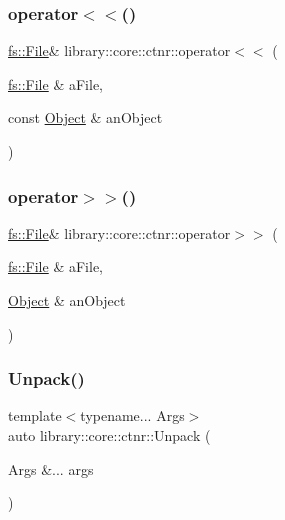 \mbox{\label{namespacelibrary_1_1core_1_1ctnr_af1692b068183ff60da620deb994a8b59}} 
\subsubsection{\texorpdfstring{operator$<$$<$()}{operator<<()}\hspace{0.1cm}{\footnotesize\ttfamily [4/4]}}
{\footnotesize\ttfamily \hyperlink{classlibrary_1_1core_1_1fs_1_1_file}{fs\+::\+File}\& library\+::core\+::ctnr\+::operator$<$$<$ (\begin{DoxyParamCaption}\item[{\hyperlink{classlibrary_1_1core_1_1fs_1_1_file}{fs\+::\+File} \&}]{a\+File,  }\item[{const \hyperlink{classlibrary_1_1core_1_1ctnr_1_1_object}{Object} \&}]{an\+Object }\end{DoxyParamCaption})}

\mbox{\label{namespacelibrary_1_1core_1_1ctnr_a0a7da2e178e3ef26afa29284deb8de0f}} 
\subsubsection{\texorpdfstring{operator$>$$>$()}{operator>>()}}
{\footnotesize\ttfamily \hyperlink{classlibrary_1_1core_1_1fs_1_1_file}{fs\+::\+File}\& library\+::core\+::ctnr\+::operator$>$$>$ (\begin{DoxyParamCaption}\item[{\hyperlink{classlibrary_1_1core_1_1fs_1_1_file}{fs\+::\+File} \&}]{a\+File,  }\item[{\hyperlink{classlibrary_1_1core_1_1ctnr_1_1_object}{Object} \&}]{an\+Object }\end{DoxyParamCaption})}

\mbox{\label{namespacelibrary_1_1core_1_1ctnr_aa83e692c1420d325c7602ae7b21d626d}} 
\subsubsection{\texorpdfstring{Unpack()}{Unpack()}}
{\footnotesize\ttfamily template$<$typename... Args$>$ \\
auto library\+::core\+::ctnr\+::\+Unpack (\begin{DoxyParamCaption}\item[{Args \&...}]{args }\end{DoxyParamCaption})}

